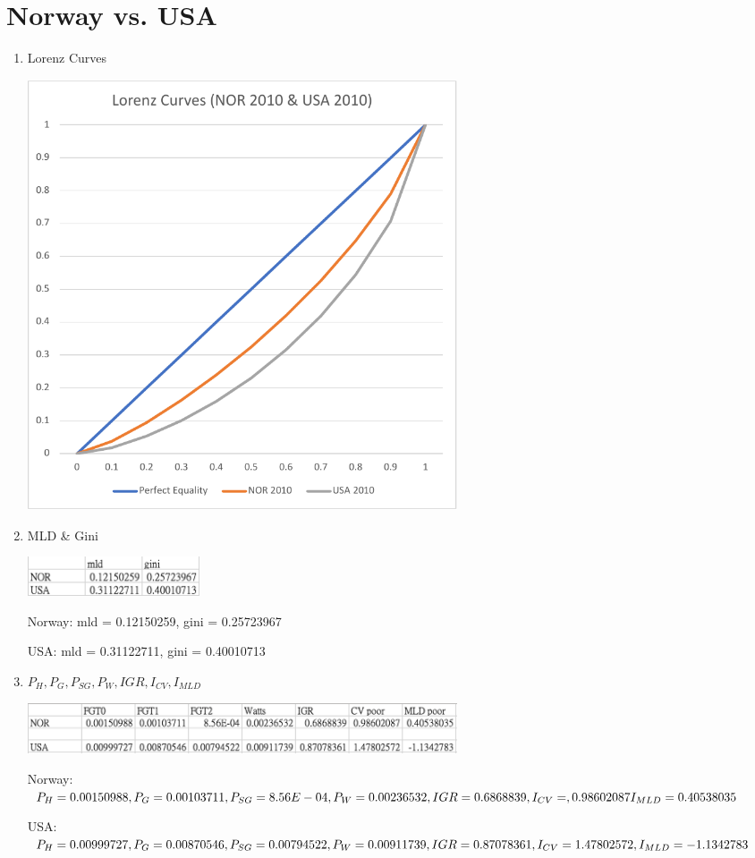 \documentclass{article}[13pt]
\begin{document}
\newpage


\section{Norway vs. USA}

\begin{enumerate}
    \item{Lorenz Curves}
    
    \includegraphics[width=5in]{nor_usa_lorenz.pdf}

    \item{MLD \& Gini}
    
    \includegraphics[width=2in]{nor_usa_2.png}

    Norway: mld = 0.12150259, gini = 0.25723967

    USA: mld = 0.31122711, gini = 0.40010713

    \item{$P_H, P_G, P_{SG}, P_W, IGR, I_{CV}, I_{MLD}$}

    \includegraphics[width=5in]{nor_usa_1.png}

    Norway: $P_H = 0.00150988, P_G = 0.00103711, P_{SG} = 8.56E-04, P_W = 0.00236532, \newline IGR = 0.6868839, I_{CV} = ,0.98602087 I_{MLD} = 0.40538035$

    USA: $P_H = 0.00999727, P_G = 0.00870546, P_{SG} = 0.00794522, P_W = 0.00911739, \newline IGR = 0.87078361, I_{CV} = 1.47802572, I_{MLD} = -1.1342783$

\end{enumerate}
\end{document}
